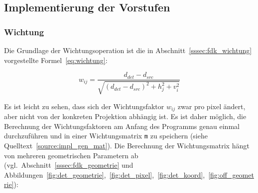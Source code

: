 \subsection{Implementierung der Vorstufen}

\subsubsection{Wichtung}

Die Grundlage der Wichtungsoperation ist die in Abschnitt~\ref{sssec:fdk_wichtung} vorgestellte
Formel~\ref{eq:wichtung}:

\begin{equation*}
    w_{ij} = \frac{d_{det} - d_{src}}{\sqrt{(d_{det} - d_{src})^2 + h_j^2 + v_i^2}}
\end{equation*}

Es ist leicht zu sehen, dass sich der Wichtungsfaktor $w_{ij}$ zwar pro \gls{pixel} ändert, aber nicht von der konkreten
Projektion abhängig ist. Es ist daher möglich, die Berechnung der Wichtungsfaktoren am Anfang des Programms genau einmal
durchzuführen und in einer Wichtungsmatrix \texttt{m} zu speichern (siehe Quelltext~\ref{source:impl_gen_mat}). Die
Berechnung der Wichtungsmatrix hängt von mehreren geometrischen Parametern ab (vgl.\
Abschnitt~\ref{sssec:fdk_geometrie} und Abbildungen~\ref{fig:det_geometrie},~\ref{fig:det_pixel},~\ref{fig:det_koord},~\ref{fig:off_geometrie}):

